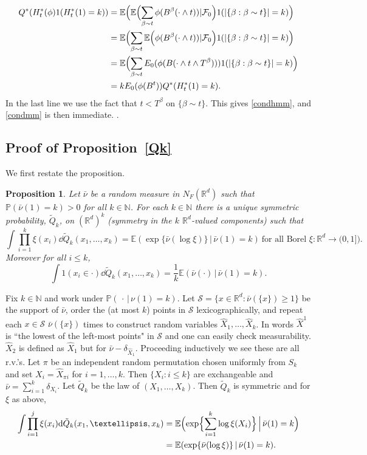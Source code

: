\documentclass[12pt]{article}
\makeatletter
\renewenvironment{proof}[1][\proofname]{%
\par\pushQED{\qed}\normalfont%
\topsep6\p@\@plus6\p@\relax
\trivlist\item[\hskip\labelsep\bfseries#1\@addpunct{.}]%
\ignorespaces
}{%
\popQED\endtrivlist\@endpefalse
}
\newtheorem{proposition}[theorem]{Proposition}
\numberwithin{theorem}{section}
\theoremstyle{def}
\numberwithin{equation}{section}
\renewcommand{\P}{\mathbb{P}}
\newcommand{\E}{\mathbb{E}}
\newcommand{\R}{\mathbb{R}}
\newcommand{\N}{\mathbb{N}}
\newcommand{\cF}{\mathcal F}
\newcommand{\cS}{\mathcal{S}}
\makeatother
\begin{document}
{\begin{proof}[Proof of Proposition~\ref{HBBMmean}]
\begin{align*}
Q^*(H^*_t(\phi)1(H^*_t(1)=k))&=\E\Bigl(\E\Bigl(\sum_{\beta\sim t}\phi(B^\beta(\cdot\wedge t))|\cF_0\Bigr)1(|\{\beta:\beta\sim t\}|=k)\Bigr)\\
&=\E\Bigl(\sum_{\beta\sim t}\E\Bigl(\phi(B^\beta(\cdot\wedge t))|\cF_0\Bigr)1(|\{\beta:\beta\sim t\}|=k)\Bigr)\\
&=\E\Bigl(\sum_{\beta\sim t}E_0(\phi(B(\cdot\wedge t\wedge T^\beta)))1(|\{\beta:\beta\sim t\}|=k)\Bigr)\\
&=kE_0(\phi(B^t))Q^*(H^*_t(1)=k).
\end{align*}
In the last line we use the fact that $t<T^\beta$ on $\{\beta\sim t\}$. This gives \eqref{condhmm}, and \eqref{condmm} is then immediate.
\end{proof}.
\subsection{Proof of Proposition~\ref{Qk}}\label{app:subsec:Qk}
We first restate the proposition.  
\begin{proposition}
	Let $\bar\nu$ be a random measure in $N_F(\R^d)$ such that $\P(\bar\nu(1)=k)>0$ for all $k\in\N$.  For each $k\in\N$ there is a unique symmetric probability, $\tilde Q_k$, on $(\R^d)^k$ (symmetry in the $k$ $\R^d$-valued components) such that
	\begin{equation}\label{QKcharapp}
		\int\prod_{i=1}^k\xi(x_i)\dd \tilde Q_k(x_1,\dots,x_k)=\E(\exp\{\bar\nu(\log\xi)\} \, | \, \bar\nu(1)=k)\ \text{for all Borel $\xi:\R^d\to(0,1]$}).
	\end{equation}
	Moreover for all $i\le k$, 
	\begin{equation}\label{Qkmarapp}
		\int 1(x_i\in\cdot)\dd \tilde Q_k(x_1,\dots,x_k)=\frac{1}{k}\E(\bar\nu(\cdot) \, | \,\bar\nu(1)=k).
	\end{equation}
\end{proposition}

\begin{proof} Fix $k\in\N$ and work under $\P(\, \cdot\, | \,\nu(1)=k)$.  
Let $\cS=\{x\in\R^d:\bar\nu(\{x\})\ge 1\}$ be the support of $\bar\nu$, order the (at most $k$) points in $\cS$ lexicographically, and repeat each $x\in\cS$ $\bar\nu(\{x\})$ times to construct random variables $\hat X_1,\dots,\hat X_k$.
In words $\hat X^1$ is ``the lowest of the left-most points" in $\cS$ and one can easily check measurability.  
$\hat X_2$ is defined as $\hat X_1$ but for $\bar\nu-\delta_{\hat X_1}$. Proceeding inductively we see these are all r.v.'s.  
Let $\pi$ be an independent random permutation chosen uniformly from $S_k$ and set $X_i=\hat X_{\pi i}$ for $i=1,\dots,k$. 
Then $\{X_i:i\le k\}$ are exchangeable and $\bar\nu=\sum_{i=1}^k\delta_{X_i}$.
Let $\tilde Q_k$ be the law of $(X_1,\dots,X_k)$.  
Then $\tilde Q_k$ is symmetric and for $\xi$ as above, 
	\begin{align*}\int\prod_{i=1}^j\xi(x_i)\dd \tilde Q_k(x_1,\dots,x_k)&=\E\Bigl(\exp\Bigl\{\sum_{i=1}^k\log\xi(X_i)\Bigr\}\, \Bigl| \, \bar\nu(1)=k\Bigr)\\
		&=\E(\exp\{\bar\nu(\log\xi)\}\, | \, \bar\nu(1)=k).
	\end{align*}
	

\end{proof}}
\end{document}
